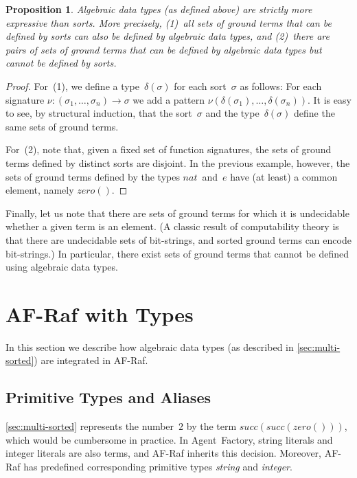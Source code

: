 \documentclass[preprint]{sigplanconf} %
\newtheorem{proposition}{Proposition}
\theoremstyle{remark}
\begin{document}
\begin{proposition}
Algebraic data types (as defined above) are strictly more expressive than
sorts. More precisely, (1)~all sets of ground terms that can be defined by
sorts can also be defined by algebraic data types, and (2)~there are pairs
of sets of ground terms that can be defined by algebraic data types but
cannot be defined by sorts.
\end{proposition}

\begin{proof}
For~(1), we define a type~$\delta(\sigma)$ for each sort~$\sigma$ as
follows: For each signature $\nu:(\sigma_1,\ldots,\sigma_n)\to\sigma$ we
add a pattern $\nu(\delta(\sigma_1),\ldots,\delta(\sigma_n))$. It is easy
to see, by structural induction, that the sort~$\sigma$ and the
type~$\delta(\sigma)$ define the same sets of ground terms.

For~(2), note that, given a fixed set of function signatures, the sets of
ground terms defined by distinct sorts are disjoint. In the previous
example, however, the sets of ground terms defined by the types
$\mathit{nat}$~and~$e$ have (at least) a common element, namely
$\mathit{zero}()$.
\end{proof}

Finally, let us note that there are sets of ground terms for which it is
undecidable whether a given term is an element.  (A classic result of
computability theory is that there are undecidable sets of bit-strings, and
sorted ground terms can encode bit-strings.) In particular, there exist
sets of ground terms that cannot be defined using algebraic data types.

\section{AF-Raf with Types} \label{sec:af-raf.types} %

In this section we describe how algebraic data types (as described in
\autoref{sec:multi-sorted}) are integrated in AF-Raf.

\subsection{Primitive Types and Aliases}

\autoref{sec:multi-sorted} represents the number~$2$ by the term
$\mathit{succ}(\mathit{succ}(\mathit{zero}()))$, which would be cumbersome
in practice. In Agent~Factory, string literals and integer literals are
also terms, and AF-Raf inherits this decision. Moreover, AF-Raf has
predefined corresponding primitive types \textit{string} and
\textit{integer}.
\end{document}
